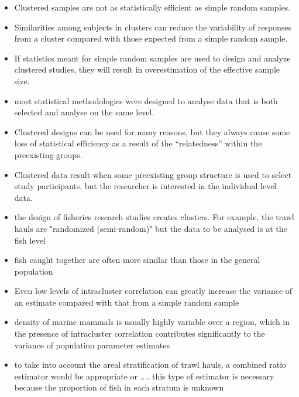 \documentclass[a4paper 12pt]{article}
\numberwithin{equation}{section}
\begin{document}
\begin{itemize}


\item Clustered samples are not as statistically efficient as simple random samples. 

\item Similarities among subjects in clusters can reduce the variability of responses from a cluster compared with those expected from a simple random sample. 

\item If statistics meant for simple random samples are used to design and analyze clustered studies, they will result in overestimation of the effective sample size.


\item most statistical methodologies were designed to analyse data that is both selected and analyse on the same level.

\item Clustered designs can be used for many reasons, but they always cause some loss of statistical efficiency as a result of the “relatedness” within the preexisting groups. 

\item Clustered data result when some preexisting group structure is used to select study participants, but the researcher is interested in the individual level data.

\item the design of fisheries research studies creates clusters. For example, the trawl hauls are "randomized (semi-random)" but the data to be analysed is at the fish level

\item fish caught together are often more similar than those in the general population 
\item Even low levels of intracluster correlation can greatly increase the variance of an estimate compared with that from a simple random sample 
\item density of marine mammals is usually highly variable over a region, which in the presence of intracluster correlation contributes significantly to the variance of population parameter estimates

\item to take into account the areal stratification of trawl hauls, a combined ratio estimator  would be appropriate or .... this type of estimator is necessary because the proportion of fish in each stratum is unknown
\end{itemize}
\end{document}
